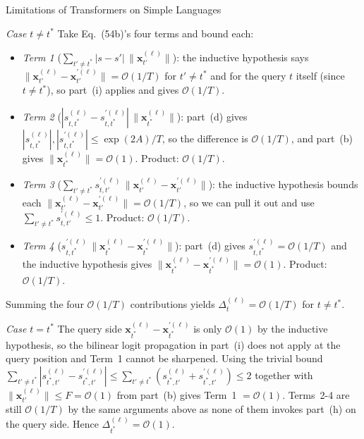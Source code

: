 \begin{question}{Limitations of Transformers on Simple Languages}
\begin{subquestion}
    \emph{Case $t \ne t^*$} Take Eq.~(54b)'s four terms and bound each:
    \begin{itemize}
        \item \emph{Term 1} ($\sum_{t' \ne t^*} |s - s'|\,\|\mathbf{x}_{t'}^{(\ell)}\|$): the inductive hypothesis says $\|\mathbf{x}_{t'}^{(\ell)} - \mathbf{x}_{t'}^{\prime(\ell)}\| = \mathcal{O}(1/T)$ for $t' \ne t^*$ and for the query $t$ itself (since $t \ne t^*$), so part~(i) applies and gives $\mathcal{O}(1/T)$.
        \item \emph{Term 2} ($|s_{t,t^*}^{(\ell)} - s_{t,t^*}^{\prime(\ell)}|\,\|\mathbf{x}_{t^*}^{(\ell)}\|$): part~(d) gives $|s_{t,t^*}^{(\ell)}|, |s_{t,t^*}^{\prime(\ell)}| \le \exp(2A)/T$, so the difference is $\mathcal{O}(1/T)$, and part~(b) gives $\|\mathbf{x}_{t^*}^{(\ell)}\| = \mathcal{O}(1)$. Product: $\mathcal{O}(1/T)$.
        \item \emph{Term 3} ($\sum_{t' \ne t^*} s_{t,t'}^{\prime(\ell)}\,\|\mathbf{x}_{t'}^{(\ell)} - \mathbf{x}_{t'}^{\prime(\ell)}\|$): the inductive hypothesis bounds each $\|\mathbf{x}_{t'}^{(\ell)} - \mathbf{x}_{t'}^{\prime(\ell)}\| = \mathcal{O}(1/T)$, so we can pull it out and use $\sum_{t' \ne t^*} s_{t,t'}^{\prime(\ell)} \le 1$. Product: $\mathcal{O}(1/T)$.
        \item \emph{Term 4} ($s_{t,t^*}^{\prime(\ell)}\,\|\mathbf{x}_{t^*}^{(\ell)} - \mathbf{x}_{t^*}^{\prime(\ell)}\|$): part~(d) gives $s_{t,t^*}^{\prime(\ell)} = \mathcal{O}(1/T)$ and the inductive hypothesis gives $\|\mathbf{x}_{t^*}^{(\ell)} - \mathbf{x}_{t^*}^{\prime(\ell)}\| = \mathcal{O}(1)$. Product: $\mathcal{O}(1/T)$.
    \end{itemize}
    Summing the four $\mathcal{O}(1/T)$ contributions yields $\Delta_t^{(\ell)} = \mathcal{O}(1/T)$ for $t \ne t^*$.

    \emph{Case $t = t^*$} 
    The query side $\mathbf{x}_{t^*}^{(\ell)} - \mathbf{x}_{t^*}^{\prime(\ell)}$ is only $\mathcal{O}(1)$ by the inductive hypothesis, so the bilinear logit propagation in part~(i) does not apply at the query position and Term~1 cannot be sharpened. 
    Using the trivial bound $\sum_{t' \ne t^*} |s_{t^*,t'}^{(\ell)} - s_{t^*,t'}^{\prime(\ell)}| \le \sum_{t' \ne t^*} (s_{t^*,t'}^{(\ell)} + s_{t^*,t'}^{\prime(\ell)}) \le 2$ together with $\|\mathbf{x}_{t'}^{(\ell)}\| \le F = \mathcal{O}(1)$ from part~(b) gives Term~1 $= \mathcal{O}(1)$. 
    Terms~2-4 are still $\mathcal{O}(1/T)$ by the same arguments above as none of them invokes part~(h) on the query side.
    Hence $\Delta_{t^*}^{(\ell)} = \mathcal{O}(1)$.


\end{subquestion}
\end{question}
